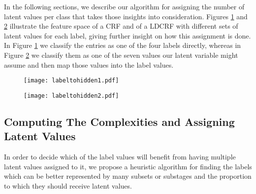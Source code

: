 \documentclass[10pt, conference]{IEEEtran}
\begin{document}
In the following sections, we describe our algorithm for assigning the number of latent values per class that takes those insights into consideration. Figures \ref{ap1} and \ref{ap2} illustrate the feature space of a CRF and of a LDCRF with different sets of latent values for each label, giving further insight on how this assignment is done. In Figure \ref{ap1} we classify the entries as one of the four labels directly, whereas in Figure \ref{ap2} we classify them as one of the seven values our latent variable might assume and then map those values into the label values.
 

\begin{figure}[t]
\begin{center}
\texttt{[image: labeltohidden1.pdf]}
\end{center}
  \label{ap1}
\end{figure}

\begin{figure}[t]
\begin{center}
\texttt{[image: labeltohidden2.pdf]}
\end{center}
  \label{ap2}
\end{figure}
 
 
 

\subsection{Computing The Complexities and Assigning Latent Values}


In order to decide which of the label values will benefit from having multiple latent values assigned to it, we propose a heuristic algorithm for finding the labels which can be better represented by many subsets or substages and the proportion to which they should receive latent values.
\end{document}
